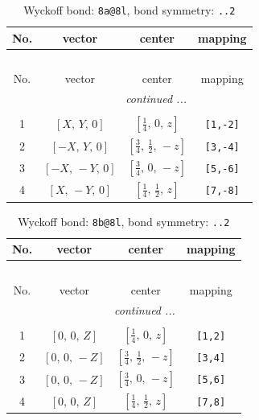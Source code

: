 \documentclass[fleqn,8pt]{jsarticle}
\begin{document}
\begin{longtable}{cccc}
\caption{Wyckoff bond: {\tt 8a@8l}, bond symmetry: {\tt ..2}}
 \\
 \hline \hline
No. & vector & center & mapping \\ \hline \endfirsthead

\multicolumn{3}{l}{\tablename\ \thetable{}} \\
 \hline \hline
No. & vector & center & mapping \\ \hline \endhead

 \hline \hline
\multicolumn{3}{r}{\footnotesize\it continued ...} \\ \endfoot

 \hline \hline
\multicolumn{3}{r}{} \\ \endlastfoot

1 & $\left[ X,\, Y,\, 0 \right]$ & $\left[ \frac{1}{4},\, 0,\, z \right]$ & {\tt [1,-2]} \\ \hline
2 & $\left[ - X,\, Y,\, 0 \right]$ & $\left[ \frac{3}{4},\, \frac{1}{2},\, - z \right]$ & {\tt [3,-4]} \\ \hline
3 & $\left[ - X,\, - Y,\, 0 \right]$ & $\left[ \frac{3}{4},\, 0,\, - z \right]$ & {\tt [5,-6]} \\ \hline
4 & $\left[ X,\, - Y,\, 0 \right]$ & $\left[ \frac{1}{4},\, \frac{1}{2},\, z \right]$ & {\tt [7,-8]} \\
\end{longtable}
\renewcommand{\arraystretch}{1.2}
\begin{longtable}{cccc}
\caption{Wyckoff bond: {\tt 8b@8l}, bond symmetry: {\tt ..2}}
 \\
 \hline \hline
No. & vector & center & mapping \\ \hline \endfirsthead

\multicolumn{3}{l}{\tablename\ \thetable{}} \\
 \hline \hline
No. & vector & center & mapping \\ \hline \endhead

 \hline \hline
\multicolumn{3}{r}{\footnotesize\it continued ...} \\ \endfoot

 \hline \hline
\multicolumn{3}{r}{} \\ \endlastfoot

1 & $\left[ 0,\, 0,\, Z \right]$ & $\left[ \frac{1}{4},\, 0,\, z \right]$ & {\tt [1,2]} \\ \hline
2 & $\left[ 0,\, 0,\, - Z \right]$ & $\left[ \frac{3}{4},\, \frac{1}{2},\, - z \right]$ & {\tt [3,4]} \\ \hline
3 & $\left[ 0,\, 0,\, - Z \right]$ & $\left[ \frac{3}{4},\, 0,\, - z \right]$ & {\tt [5,6]} \\ \hline
4 & $\left[ 0,\, 0,\, Z \right]$ & $\left[ \frac{1}{4},\, \frac{1}{2},\, z \right]$ & {\tt [7,8]} \\
\end{longtable}
\end{document}

